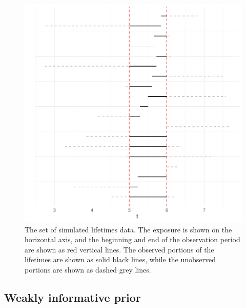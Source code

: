 \begin{figure}
    \centering
    \includegraphics[width=1\textwidth]{./figures/ch-2/sim-data.pdf}
    \caption{The set of simulated lifetimes data. The exposure is shown on the horizontal axis, and the beginning and end of the observation period are shown as red vertical lines. The observed portions of the lifetimes are shown as solid black lines, while the unobserved portions are shown as dashed grey lines.}
    \label{fig:sim_censored_units}
\end{figure}



\subsection{Weakly informative prior} \label{subsec:weibull-model-fits}

